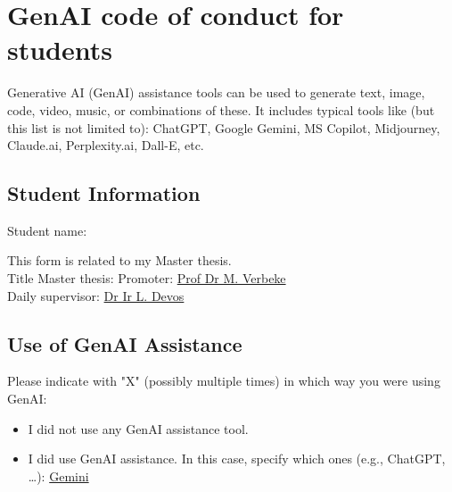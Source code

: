 \chapter{GenAI code of conduct for students}

Generative AI (GenAI) assistance tools can be used to generate text, image, code, video, music, or combinations of these. It includes typical tools like (but this list is not limited to): ChatGPT, Google Gemini, MS Copilot, Midjourney, Claude.ai, Perplexity.ai, Dall-E, etc.

\section*{Student Information}
\begin{tabbing}
\makeatletter%
Student name: \@forenameA \ \@surnameA
\makeatother
\end{tabbing}

This form is related to my Master thesis. \\
\makeatletter%
Title Master thesis: \@title \hspace{1cm} Promoter: \underline{Prof Dr M. Verbeke}\\
Daily supervisor: \underline{Dr Ir L. Devos}
\makeatother


\section*{Use of GenAI Assistance}
Please indicate with "X" (possibly multiple times) in which way you were using GenAI:

\begin{itemize}
    \item[$\Box$] I did not use any GenAI assistance tool.
    \item[$\boxtimes$] I did use GenAI assistance. In this case, specify which ones (e.g., ChatGPT, \ldots): \underline{Gemini}
\end{itemize}

